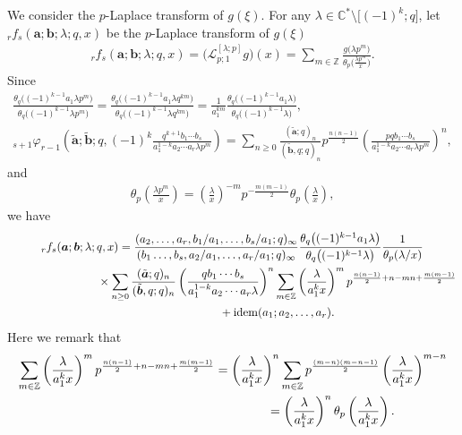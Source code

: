 \documentclass[pdftex]{sigma}
\numberwithin{equation}{section}
\newcommand{\idem}{{\rm idem}}
\begin{document}
We consider the $p$-Laplace transform of $g(\xi)$. For any $\lambda\in\mathbb{C}^*\setminus\big[(-1)^k;q\big]$, let ${}_rf_s(\bm{a};\bm{b};\lambda;q,x)$ be the $p$-Laplace transform of $g(\xi)$
\begin{gather*}
{}_rf_s(\bm{a};\bm{b};\lambda;q,x)=\big(\mathcal{L}_{p;1}^{[\lambda;p]}g\big)(x)=\sum_{m\in\mathbb{Z}}\frac{g\big(\lambda p^m\big)}{\theta_p\big(\frac{\lambda p^m}{x}\big)}.
\end{gather*}
Since
\begin{gather*}
\frac{\theta_q\big((-1)^{k-1}a_1\lambda p^m\big)}{\theta_q\big((-1)^{k-1}\lambda p^m\big)}=\frac{\theta_q\big((-1)^{k-1}a_1\lambda q^{km}\big)}{\theta_q\big((-1)^{k-1}\lambda q^{km}\big)}=\frac{1}{a_1^{km}}\frac{\theta_q\big((-1)^{k-1}a_1\lambda\big)}{\theta_q\big((-1)^{k-1}\lambda\big)},
\\
{}_{s+1}\varphi_{r-1}\left(\tilde{\bm{a}};\tilde{\bm{b}};q,(-1)^k\frac{q^{k+1}b_1\cdots b_s}{a_1^{1-k}a_2\cdots a_r\lambda p^m}\right)=\sum_{n\ge0}\frac{(\tilde{\bm{a}};q)_n}{(\tilde{\bm{b}},q;q)_n}p^{\frac{n(n-1)}{2}}\left(\frac{pqb_1\cdots b_s}{a_1^{1-k}a_2\cdots a_r\lambda p^m}\right)^n,
\end{gather*}
and
\begin{gather*}
\theta_p\left(\frac{\lambda p^m}{x}\right)=\left(\frac{\lambda}{x}\right)^{-m}p^{-\frac{m(m-1)}{2}}\theta_p\left(\frac{\lambda}{x}\right),
\end{gather*}
we have
\begin{gather*}
{}_rf_s(\bm{a};\bm{b};\lambda;q,x)= \frac{(a_2,\ldots,a_r,b_1/a_1,\ldots,b_{s}/a_1;q)_\infty}{(b_1\ldots,b_s,a_2/a_1,\ldots, a_r/a_1;q)_\infty}\frac{\theta_q\big((-1)^{k-1}a_1\lambda\big)}{\theta_q\big((-1)^{k-1}\lambda\big)}\frac{1}{\theta_p(\lambda/x)}\\
\hphantom{{}_rf_s(\bm{a};\bm{b};\lambda;q,x)=}{} \times\sum_{n\ge0}\frac{(\tilde{\bm{a}};q)_n}{(\tilde{\bm{b}},q;q)_n}\left(\frac{qb_1\cdots b_s}{a_1^{1-k}a_2\cdots a_r\lambda}\right)^n \sum_{m\in\mathbb{Z}}\left(\frac{\lambda}{a_1^kx}\right)^mp^{\frac{n(n-1)}{2}+n-mn+\frac{m(m-1)}{2}}\\
\hphantom{{}_rf_s(\bm{a};\bm{b};\lambda;q,x)=}{} +\idem(a_1;a_2,\ldots,a_r).
\end{gather*}
Here we remark that
\begin{gather*}
\sum_{m\in\mathbb{Z}}\left(\frac{\lambda}{a_1^kx}\right)^mp^{\frac{n(n-1)}{2}+n-mn+\frac{m(m-1)}{2}} =\left(\frac{\lambda}{a_1^kx}\right)^n\sum_{m\in\mathbb{Z}}p^{\frac{(m-n)(m-n-1)}{2}}\left(\frac{\lambda}{a_1^kx}\right)^{m-n}\\
\hphantom{\sum_{m\in\mathbb{Z}}\left(\frac{\lambda}{a_1^kx}\right)^mp^{\frac{n(n-1)}{2}+n-mn+\frac{m(m-1)}{2}} }{}
=\left(\frac{\lambda}{a_1^kx}\right)^n\theta_p\left(\frac{\lambda}{a_1^kx}\right).
\end{gather*}
\end{document}
